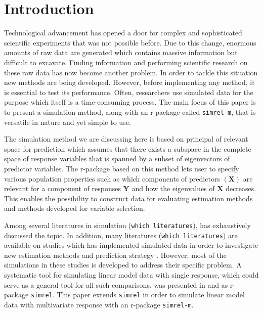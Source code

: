 \documentclass[12pt,A4paper,authoryear]{elsarticle} %
\begin{document}
\section{Introduction}\label{introduction}

Technological advancement has opened a door for complex and
sophisticated scientific experiments that was not possible before. Due
to this change, enormous amounts of raw data are generated which
contains massive information but difficult to excavate. Finding
information and performing scientific research on these raw data has now
become another problem. In order to tackle this situation new methods
are being developed. However, before implementing any method, it is
essential to test its performance. Often, researchers use simulated data
for the purpose which itself is a time-consuming process. The main focus
of this paper is to present a simulation method, along with an r-package
called \texttt{simrel-m}, that is versatile in nature and yet simple to
use.

The simulation method we are discussing here is based on principal of
relevant space for prediction \citep{helland1994comparison} which
assumes that there exists a subspace in the complete space of response
variables that is spanned by a subset of eigenvectors of predictor
variables. The r-package based on this method lets user to specify
various population properties such as which components of predictors
\((\mathbf{X})\) are relevant for a component of responses
\(\mathbf{Y}\) and how the eigenvalues of \(\mathbf{X}\) decreases. This
enables the possibility to construct data for evaluating estimation
methods and methods developed for variable selection.

Among several literatures in simulation
({\color{red}\texttt{which\ literatures}}), \citet{ripley2009stochastic}
has exhaustively discussed the topic. In addition, many literatures
({\color{red}\texttt{which\ literatures}}) are available on studies
which has implemented simulated data in order to investigate new
estimation methods and prediction strategy
\citep[see:][]{cook2015simultaneous, cook2013envelopes, helland2012near}.
However, most of the simulations in these studies is developed to
address their specific problem. A systematic tool for simulating linear
model data with single response, which could serve as a general tool for
all such comparisons, was presented in \citet{saebo2015simrel} and as
r-package \texttt{simrel}. This paper extends \texttt{simrel} in order
to simulate linear model data with multivariate response with an
r-package \texttt{simrel-m}.
\end{document}
